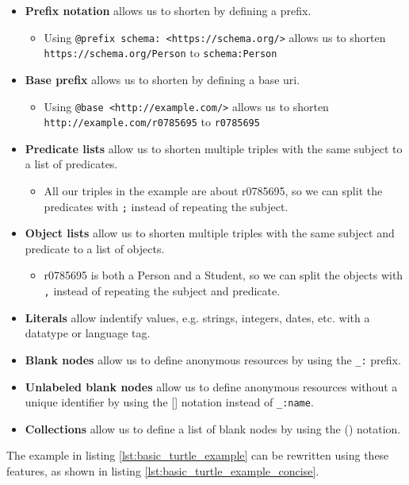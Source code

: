 \begin{itemize}
    \item \textbf{Prefix notation} allows us to shorten  by defining a prefix.
    \begin{itemize}
        \item Using \texttt{@prefix schema: <https://schema.org/>} allows us to shorten \break\texttt{https://schema.org/Person} to \texttt{schema:Person}
    \end{itemize}
    \item \textbf{Base prefix} allows us to shorten  by defining a base \acrshort{uri}.
    \begin{itemize}
        \item Using \texttt{@base <http://example.com/>} allows us to shorten \break\texttt{http://example.com/r0785695} to \texttt{r0785695}
    \end{itemize}
    \item \textbf{Predicate lists} allow us to shorten multiple triples with the same subject to a list of predicates.
    \begin{itemize}
        \item All our triples in the example are about r0785695, so we can split the predicates with \texttt{;} instead of repeating the subject.
    \end{itemize}
    \item \textbf{Object lists} allow us to shorten multiple triples with the same subject and predicate to a list of objects.
    \begin{itemize}
        \item r0785695 is both a Person and a Student, so we can split the objects with \texttt{,} instead of repeating the subject and predicate.
    \end{itemize}
    \item \textbf{Literals} allow indentify values, e.g. strings, integers, dates, etc. with a datatype or language tag.
    \item \textbf{Blank nodes} allow us to define anonymous resources by using the \texttt{\_:} prefix.
    \item \textbf{Unlabeled blank nodes} allow us to define anonymous resources without a unique identifier by using the [] notation instead of \texttt{\_:name}.
    \item \textbf{Collections} allow us to define a list of blank nodes by using the () notation.
\end{itemize}
The example in listing \ref{lst:basic_turtle_example} can be rewritten using these features, as shown in listing \ref{lst:basic_turtle_example_concise}.


